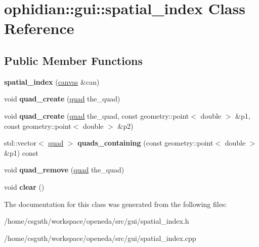 \hypertarget{classophidian_1_1gui_1_1spatial__index}{\section{ophidian\-:\-:gui\-:\-:spatial\-\_\-index Class Reference}
\label{classophidian_1_1gui_1_1spatial__index}
}
\subsection*{Public Member Functions}
\begin{DoxyCompactItemize}
\item 
\hypertarget{classophidian_1_1gui_1_1spatial__index_af7a52200d16b8bb7036ee3ffea9e3ca4}{{\bfseries spatial\-\_\-index} (\hyperlink{classophidian_1_1gui_1_1canvas}{canvas} \&can)}\label{classophidian_1_1gui_1_1spatial__index_af7a52200d16b8bb7036ee3ffea9e3ca4}

\item 
\hypertarget{classophidian_1_1gui_1_1spatial__index_a95bf4a859740e0e29abdfe9313d5069a}{void {\bfseries quad\-\_\-create} (\hyperlink{structophidian_1_1gui_1_1quad}{quad} the\-\_\-quad)}\label{classophidian_1_1gui_1_1spatial__index_a95bf4a859740e0e29abdfe9313d5069a}

\item 
\hypertarget{classophidian_1_1gui_1_1spatial__index_af9970759a31001dff84321debcf65f7a}{void {\bfseries quad\-\_\-create} (\hyperlink{structophidian_1_1gui_1_1quad}{quad} the\-\_\-quad, const geometry\-::point$<$ double $>$ \&p1, const geometry\-::point$<$ double $>$ \&p2)}\label{classophidian_1_1gui_1_1spatial__index_af9970759a31001dff84321debcf65f7a}

\item 
\hypertarget{classophidian_1_1gui_1_1spatial__index_ad5bc10042beceba695bd02f605caea51}{std\-::vector$<$ \hyperlink{structophidian_1_1gui_1_1quad}{quad} $>$ {\bfseries quads\-\_\-containing} (const geometry\-::point$<$ double $>$ \&p1) const }\label{classophidian_1_1gui_1_1spatial__index_ad5bc10042beceba695bd02f605caea51}

\item 
\hypertarget{classophidian_1_1gui_1_1spatial__index_a66c6b8e4a4b86067a2cc643c7d68b085}{void {\bfseries quad\-\_\-remove} (\hyperlink{structophidian_1_1gui_1_1quad}{quad} the\-\_\-quad)}\label{classophidian_1_1gui_1_1spatial__index_a66c6b8e4a4b86067a2cc643c7d68b085}

\item 
\hypertarget{classophidian_1_1gui_1_1spatial__index_a084079d1b9c5988d6fa3ad487582682a}{void {\bfseries clear} ()}\label{classophidian_1_1gui_1_1spatial__index_a084079d1b9c5988d6fa3ad487582682a}

\end{DoxyCompactItemize}


The documentation for this class was generated from the following files\-:\begin{DoxyCompactItemize}
\item 
/home/csguth/workspace/openeda/src/gui/spatial\-\_\-index.\-h\item 
/home/csguth/workspace/openeda/src/gui/spatial\-\_\-index.\-cpp\end{DoxyCompactItemize}
